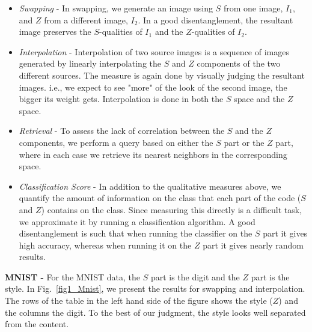 \documentclass[10pt,twocolumn,letterpaper]{article}
\begin{document}
\begin{itemize}[leftmargin=*]
\item \textit{Swapping} - In swapping, we generate an image using $S$ from one image, $I_1$, and $Z$ from a different image, $I_2$. In a good disentanglement, the resultant image preserves the $S$-qualities of $I_1$ and the $Z$-qualities of $I_2$.

\item\textit{Interpolation} - Interpolation of two source images is a sequence of images generated by linearly interpolating the $S$ and $Z$ components  of the two different sources. The measure is again done by visually judging the resultant images. i.e., we expect to see "more" of the look of the second image, the bigger its weight gets. Interpolation is done in both the $S$ space and the $Z$ space.

\item\textit{Retrieval} - To assess the lack of correlation between the $S$ and the $Z$ components, we perform a query based on either the $S$ part or the $Z$ part, where in each case we retrieve its nearest neighbors in the corresponding space. 

\item\textit{Classification Score} - In addition to the qualitative measures above, we quantify the amount of information on the class that each part of the code ($S$ and $Z$) contains on the class. Since measuring this directly is a difficult task, we approximate it by running a classification algorithm. A good disentanglement is such that when running the classifier on the $S$ part it gives high accuracy, whereas when running it on the $Z$ part it gives nearly random results. 

\end{itemize}


\textbf{MNIST - } For the MNIST data, the $S$ part is the digit and the $Z$ part is the style. In Fig.~\ref{fig1_Mnist}, we present the results for swapping and interpolation. The rows of the table in the left hand side of the figure shows the style ($Z$) and the columns the digit. To the best of our judgment, the style looks well separated from the content. 
\end{document}
